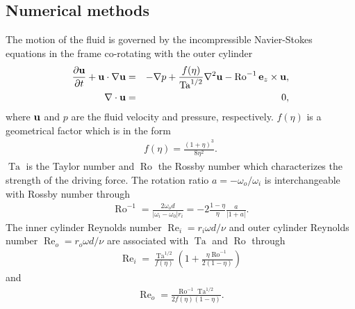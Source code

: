 \documentclass[aps,prl,superscriptaddress,preprint]{revtex4}
\renewcommand{\Re}{\operatorname{Re}}
\newcommand{\Ta}{\operatorname{Ta}}
\newcommand{\Ro}{\operatorname{Ro}}
\begin{document}
\subsection{Numerical methods}
The motion of the fluid is governed by the incompressible Navier-Stokes equations in the frame co-rotating with the outer cylinder
\begin{eqnarray}
\label{equ1}
\frac{\partial \bf{u}}{\partial t}+{\bf{u}} \cdot \nabla {\bf u} &=&- \nabla p + \frac{f(\eta)}{\Ta^{1/2}}{\nabla}^2 {\bf u}-\Ro^{-1}{\bf e }_z\times {\bf u }, \\
\nabla  \cdot {\bf u} &=& 0, 
\end{eqnarray}
where $\bf u$ and $p$ are the fluid velocity and pressure, respectively. $f(\eta)$ is a geometrical factor which is in the form 
\begin{eqnarray}
f(\eta)= \frac{(1+\eta)^3}{8\eta^2}.
\end{eqnarray}
$\Ta$ is the Taylor number and $\Ro$ the Rossby number which characterizes the strength of the driving force. The rotation ratio $a=-\omega_o/\omega_i$ is interchangeable with Rossby number through
\begin{eqnarray}
\Ro^{-1} =\frac{2\omega_o d}{|\omega_i-\omega_0|r_i}=-2\frac{1-\eta}{\eta}\frac{a}{|1+a|}.
\end{eqnarray}
The inner cylinder Reynolds number $\Re_i=r_i\omega d/\nu$ and outer cylinder Reynolds number $\Re_o=r_o\omega d/\nu$ are associated with $\Ta$ and $\Ro$ through
\begin{eqnarray}
\Re_i=\frac{\Ta^{1/2}} {f(\eta)} \left (1+\frac{\eta \Ro^{-1}}{2(1-\eta)}\right)
\end{eqnarray}
and
\begin{eqnarray}
\Re_o=\frac{\Ro^{-1}\Ta^{1/2}}{2f(\eta)(1-\eta)}.
\end{eqnarray}
\end{document}
